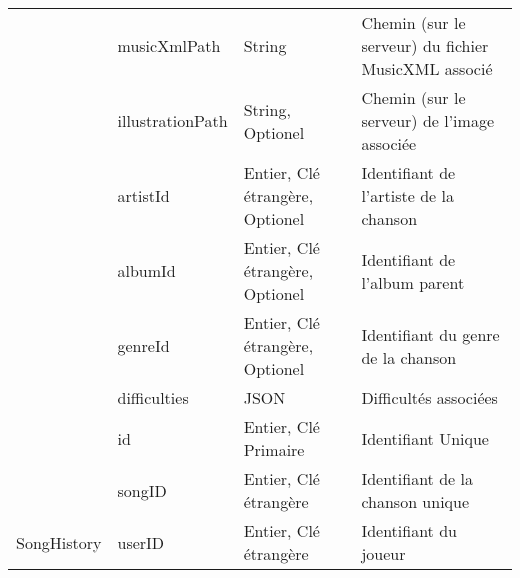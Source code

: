 \begin{longtable}[c]{@{}|p{}|p{}|p{}|p{}|@{}}
														& musicXmlPath                                         & String                                                                                   & Chemin (sur le serveur) du fichier MusicXML associé                                      \\* \cmidrule(l){2-4} 
														& illustrationPath                                     & String, Optionel                                                                         & Chemin (sur le serveur) de l’image associée                                              \\* \cmidrule(l){2-4} 
														& artistId                                             & Entier, Clé étrangère, Optionel                                                          & Identifiant de l’artiste de la chanson                                                   \\* \cmidrule(l){2-4} 
														& albumId                                              & Entier, Clé étrangère, Optionel                                                          & Identifiant de l’album parent                                                            \\* \cmidrule(l){2-4} 
														& genreId                                              & Entier, Clé étrangère, Optionel                                                          & Identifiant du genre de la chanson                                                       \\* \cmidrule(l){2-4} 
							                            & difficulties                                         & JSON                                                                                     & Difficultés associées                                                                    \\* \midrule
														& id                                                   & Entier, Clé Primaire                                                                     & Identifiant Unique                                                                       \\* \cmidrule(l){2-4} 
														& songID                                               & Entier, Clé étrangère                                                                    & Identifiant de la chanson unique                                                         \\* \cmidrule(l){2-4} 
	\multirow{-3}{*}{SongHistory}						& userID                                               & Entier, Clé étrangère                                                                    & Identifiant du joueur                                                                    \\* \cmidrule(l){2-4} 

\end{longtable}
